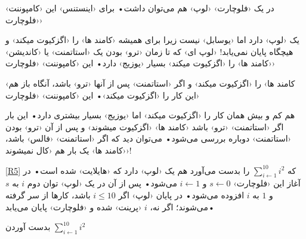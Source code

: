 \documentclass[openany, twocolumn]{book}
\begin{document}
در یک ‹فلوچارت› ‹لوپ› هم می‌توان داشت• برای ‹اینستنس› این ‹کامپوننت› ‹فلوچارت›  یک ‹لوپ› دارد اما ‹یوسابل› نیست زیرا برای همیشه ‹کامند ها› را ‹اگزکیوت میکند› و هیچگاه پایان نمی‌یابد! ‹لوپ ای› که تا زمان ‹ترو› بودن یک ‹استاتمنت› یا ‹کاندیشن› ‹کامند ها› را ‹اگزکیوت میکند› بسیار ‹یوزیج› دارد• این ‹کامپوننت› ‹فلوچارت›  ‹کامند ها› را ‹اگزکیوت میکند› و اگر ‹استاتمنت› پس از آنها ‹ترو› باشد، آنگاه باز هم این کار را ‹اگزکیوت میکند›• این ‹کامپوننت› ‹فلوچارت›  هم کم و بیش همان کار را ‹اگزکیوت میکند› اما ‹یوزیج› بسیار بیشتری دارد• این بار اگر ‹استاتمنت› ‹ترو› باشد ‹کامند ها› ‹اگزکیوت میشوند› و پس از آن ‹ترو› بودن ‹استاتمنت› دو‌باره بررسی می‌شود• می‌توان دید که اگر ‹استاتمنت› ‹فالس› باشد، ‹کامند ها› یک بار هم ‹کال نمیشوند›!

\ref{R5} که $\sum_{i\gets1}^{10}i^{2}$ را بدست می‌آورد هم یک ‹لوپ› دارد که ‹هایلایت› شده است• در آغاز این ‹فلوچارت› $s\gets0$ و $i\gets1$ می‌شود• پس از آن در یک ‹لوپ› توان دوم $i$ به $s$ و $1$ به $i$ افزوده می‌شود• در پایان ‹لوپ› اگر $i\le10$ باشد، کار‌ها از سر گرفته می‌شوند؛ اگر نه، $i$ ‹پرینت› شده و ‹فلوچارت› پایان می‌یابد•

\begin{Flowchart}

\caption{بدست آوردن $\sum_{i\gets1}^{10}i^{2}$\label{R5}}
\end{Flowchart}
\end{document}
